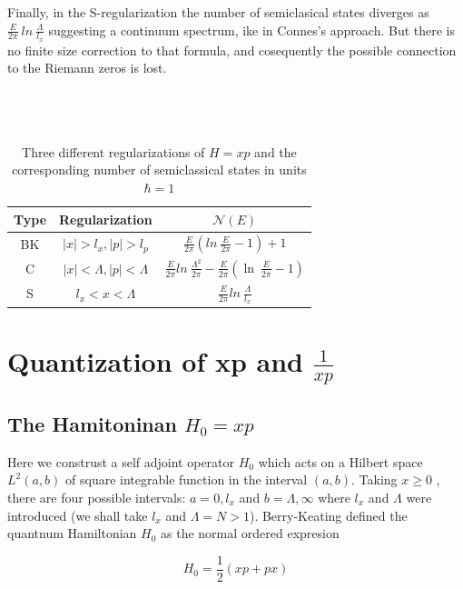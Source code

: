 \documentclass[12pt, letterpaper]{article}
\newcommand*{\1}{\hspace{1pt}}
\begin{document}
    Finally, in the S-regularization the number of semiclasical states diverges as $\frac{E}{2\pi} \ ln \ \frac{\Lambda}{l_{x}}$ suggesting a continuum spectrum, ike in 
    Connes's approach. But there is no finite size correction to that formula, and cosequently the possible connection to the Riemann zeros is lost. \\ 
    \\ 
    \\


    \begin{longtable}[c]{c c c }
        \caption{\\Three different regularizations of $H=xp$ and the corresponding number of semiclassical states in units $\hbar=1$\cite{s7} }\\
        \hline
         Type & Regularization & $\mathcal{N}(E)$\\
         \hline 
         BK & $|x| > l_{x}, |p| > l_{p}$ & $\frac{E}{2\pi}\left(ln \ \frac{E}{2\pi}-1\right)+1$  \\  
         C & $|x| < \Lambda, |p| < \Lambda$ & $\frac{E}{2\pi}ln \ \frac{\Lambda^{2}}{2\pi} - \frac{E}{2\pi}\left(\ln \ \frac{E}{2\pi}-1\right)$   \\ 
         S & $l_{x} < x < \Lambda$ & $\frac{E}{2\pi}ln \ \frac{\Lambda}{l_{x}}$   \\ 
        \hline
    \end{longtable}
    \section{Quantization of xp and $\frac{1}{xp}$}
    
    
    \subsection{The Hamitoninan $H_{0} = xp$}

        Here we construst a self adjoint operator $H_{0}$ which acts on a Hilbert space $L^{2}(a,b)$ of square integrable function in the interval $(a,b)$. Taking $x\geqslant 0$
        , there are four possible intervals: $a=0,l_{x}$ and $b=\Lambda, \infty $ where $l_{x}$ and $\Lambda$ were introduced (we shall take $l_{x}$ and $\Lambda = N > 1$).
        Berry-Keating defined the quantnum Hamiltonian $H_{0}$ as the normal ordered expresion 

        \begin{equation}
            H_{0} = \frac{1}{2}(xp + px)
        \end{equation}
\end{document}
